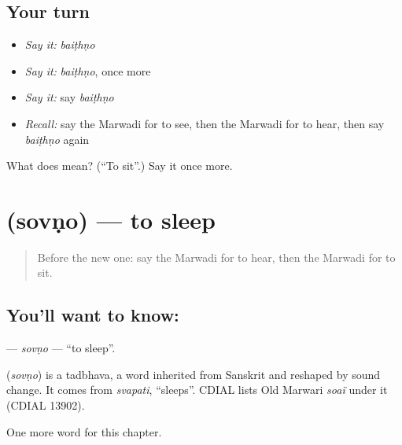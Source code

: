 \subsection*{Your turn}
\begin{itemize}
\raggedright
  \item \emph{Say it:} \emph{baiṭhṇo}
  \item \emph{Say it:} \emph{baiṭhṇo}, once more
  \item \emph{Say it:} say \emph{baiṭhṇo}
  \item \emph{Recall:} say the Marwadi for to see, then the Marwadi for to hear, then say \emph{baiṭhṇo} again
\end{itemize}

\begin{tcolorbox}[breakable,colback=teal!4,colframe=teal!35!black,title={Before you move on}]
What does  mean? (\textquotedblleft{}To sit\textquotedblright{}.) Say it once more.
\end{tcolorbox}
\section[\texorpdfstring{\mw{सोवणो} (sovṇo)}{सोवणो (sovṇo)}]{ (sovṇo) — to sleep}

\label{lesson:MW-C52-sovno}



\begin{quote}
Before the new one: say the Marwadi for to hear, then the Marwadi for to sit.
\end{quote}

\subsection*{You'll want to know: }
\textbf{} — \emph{sovṇo} — \textquotedblleft{}to sleep\textquotedblright{}.

\begin{cousinweb}
\textbf{} (\emph{sovṇo}) is a tadbhava, a word inherited from Sanskrit and reshaped by sound change. It comes from \emph{svapati}, \textquotedblleft{}sleeps\textquotedblright{}. CDIAL lists Old Marwari \emph{soaï} under it (CDIAL 13902).
\end{cousinweb}

\begin{grammarlens}[title={What you've built}]
One more word for this chapter.
\end{grammarlens}

